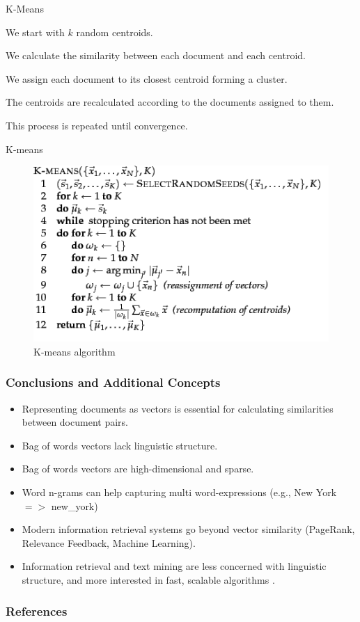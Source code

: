 \documentclass[handout]{beamer}
\begin{document}
\begin{frame}{K-Means}
\footnotesize{
    \begin{enumerate}
    \footnotesize{
    \item We start with $k$ random centroids.
    \item We calculate the similarity between each document and each centroid.
    \item We assign each document to its closest centroid forming a cluster.
    \item The centroids are recalculated according to the documents assigned to them.
    \item This process is repeated until convergence.}
    \end{enumerate}

}
\end{frame}


\begin{frame}{K-means}
\begin{figure}[h!]
	\centering
	\includegraphics[scale=0.6]{pics/kmeans.png}
	\caption{ K-means algorithm}
\end{figure}

 
\end{frame}

\begin{frame}\frametitle{Conclusions and Additional Concepts}
\footnotesize{
\begin{itemize}
 \item Representing documents as vectors is essential for calculating similarities between document pairs.
 \item Bag of words vectors lack linguistic structure.
 \item Bag of words vectors are high-dimensional and sparse. 
 \item Word n-grams can help capturing multi word-expressions (e.g., New York $=>$ new\_york)
 \item Modern information retrieval systems go beyond vector similarity (PageRank, Relevance Feedback, Machine Learning).
 \item Information retrieval and text mining are less concerned with linguistic structure, and more interested in fast, scalable algorithms \cite{jacobbook}. 
\end{itemize}


}
\end{frame}



\begin{frame}[allowframebreaks]\scriptsize
\frametitle{References}


%
\end{frame}



\end{document}

